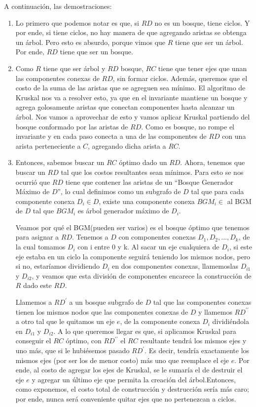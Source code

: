 A continuación, las demostraciones:

\begin{enumerate}
	\item Lo primero que podemos notar es que, si $RD$ no es un bosque, tiene ciclos. Y por ende, si tiene ciclos, no hay manera de que agregando aristas se obtenga un árbol. Pero esto es absurdo, porque vimos que $R$ tiene que ser un árbol. Por ende, $RD$ tiene que ser un bosque.

	\item Como $R$ tiene que ser árbol y $RD$ bosque, $RC$ tiene que tener ejes que unan las componentes conexas de $RD$, sin formar ciclos. Además, queremos que el costo de la suma de las aristas que se agreguen sea mínimo. El algoritmo de Kruskal nos va a resolver esto, ya que en el invariante mantiene un bosque y agrega golosamente aristas que conectan componentes hasta alcanzar un árbol. Nos vamos a aprovechar de esto y vamos aplicar Kruskal partiendo del bosque conformado por las aristas de $RD$. Como es bosque, no rompe el invariante y en cada paso conecta a una de las componentes de $RD$ con una arista perteneciente a $C$, agregando dicha arista a $RC$. %

	\item Entonces, sabemos buscar un $RC$ óptimo dado un $RD$. Ahora, tenemos que buscar un $RD$ tal que los costos resultantes sean mínimos. Para esto se nos ocurrió que $RD$ tiene que contener las aristas de un “Bosque Generador Máximo de $D$”, lo cual definimos como un subgrafo de $D$ tal que para cada componente conexa $D_i \in D$, existe una componente conexa $BGM_i \in$ al BGM de $D$ tal que $BGM_i$ es árbol generador máximo de $D_i$.

Veamos por qué el BGM(pueden ser varios) es el bosque óptimo que tenemos para asignar a $RD$. Tenemos a $D$ con componentes conexas $D_1 , D_2 , ... , D_k$, de la cual tomamos $D_i$ con i entre 0 y k. Al sacar un eje cualquiera de $D_i$, si este eje estaba en un ciclo la componente seguirá teniendo los mismos nodos, pero si no, estaríamos dividiendo $D_i$ en dos componentes conexas, llamemoslas $D_{i1}$ y $D_{i2}$, y veamos que esta división de componentes encarece la construcción de $R$ dado este $RD$. 

Llamemos a $RD^{\prime}$ a un bosque subgrafo de $D$ tal que las componentes conexas tienen los mismos nodos que las componentes conexas de $D$ y llamemos $RD^{\prime\prime}$ a otro tal que le quitamos un eje $e$, de la componente conexa $D_i$ dividiéndola en $D_{i1}$ y $D_{i2}$. A lo que queremos llegar es que, si aplicamos Kruskal para conseguir el $RC$ óptimo, con $RD^{\prime\prime}$ el $RC$ resultante tendrá los mismos ejes y uno más, que si le hubiésemos pasado $RD^{\prime}$. Es decir, tendría exactamente los mismos ejes (por ser los de menor costo) más uno que reemplace el eje $e$. Por ende, al costo de agregar los ejes de Kruskal, se le sumaría el de destruir el eje $e$ y agregar un último eje que permita la creación del árbol.Entonces, como exponemos, el costo total de construcción y destrucción sería más caro; por ende, nunca será conveniente quitar ejes que no pertenezcan a ciclos. 


\end{enumerate}
